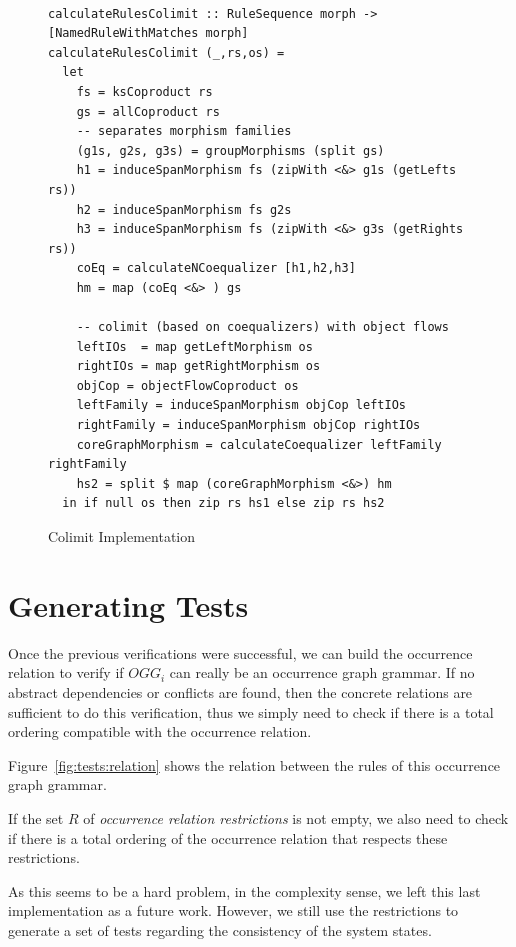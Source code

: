 \begin{figure}[!ht]
\caption{Colimit Implementation}
\begin{verbatim}

calculateRulesColimit :: RuleSequence morph -> [NamedRuleWithMatches morph]
calculateRulesColimit (_,rs,os) =
  let
    fs = ksCoproduct rs
    gs = allCoproduct rs 
    -- separates morphism families
    (g1s, g2s, g3s) = groupMorphisms (split gs)
    h1 = induceSpanMorphism fs (zipWith <&> g1s (getLefts rs))
    h2 = induceSpanMorphism fs g2s
    h3 = induceSpanMorphism fs (zipWith <&> g3s (getRights rs))
    coEq = calculateNCoequalizer [h1,h2,h3]
    hm = map (coEq <&> ) gs
    
    -- colimit (based on coequalizers) with object flows
    leftIOs  = map getLeftMorphism os
    rightIOs = map getRightMorphism os
    objCop = objectFlowCoproduct os
    leftFamily = induceSpanMorphism objCop leftIOs
    rightFamily = induceSpanMorphism objCop rightIOs
    coreGraphMorphism = calculateCoequalizer leftFamily rightFamily
    hs2 = split $ map (coreGraphMorphism <&>) hm
  in if null os then zip rs hs1 else zip rs hs2

\end{verbatim}
\label{fig:tests-colimit}
\end{figure}

\section{Generating Tests}

Once the previous verifications were successful, we can build the occurrence relation to verify if $OGG_i$ can really be an occurrence graph grammar. If no abstract dependencies or conflicts are found, then the concrete relations are sufficient to do this verification, thus we simply need to check if there is a total ordering compatible with the occurrence relation.

\begin{example} Figure~\ref{fig:tests:relation} shows the relation between the rules of this occurrence graph grammar.
\end{example}

If the set $R$ of \emph{occurrence relation restrictions} is not empty, we also need to check if there is a total ordering of the occurrence relation that respects these restrictions.

As this seems to be a hard problem, in the complexity sense, we left this last implementation as a future work. However, we still use the restrictions to generate a set of tests regarding the consistency of the system states.


